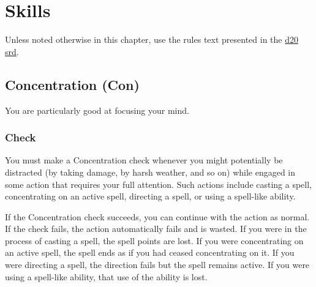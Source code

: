 \section{Skills}
Unless noted otherwise in this chapter, use the rules text presented in the
\href{http://www.wizards.com/default.asp?x=d20/article/srd35}{d20 srd}.
\subsection[Concentration]{Concentration (Con)}
\label{sec:Concentration}
You are particularly good at focusing your mind.
\subsubsection{Check}
You must make a Concentration check whenever you might potentially be distracted (by taking damage, by harsh weather, and so on) 
while engaged in some action that requires your full attention. 
Such actions include casting a spell, concentrating on an active spell, directing a spell, or using a spell-like ability.

If the Concentration check succeeds, you can continue with the action as normal. 
If the check fails, the action automatically fails and is wasted. 
If you were in the process of casting a spell, the spell points are lost. 
If you were concentrating on an active spell, the spell ends as if you had ceased concentrating on it. 
If you were directing a spell, the direction fails but the spell remains active. 
If you were using a spell-like ability, that use of the ability is lost.

